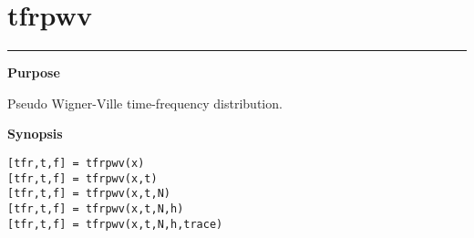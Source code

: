 

\section*{\hspace*{-1.6cm} tfrpwv}

\vspace*{-.4cm}
\hspace*{-1.6cm}\rule[0in]{16.5cm}{.02cm}
\vspace*{.2cm}

{\bf \large \sf Purpose}\\
\hspace*{1.5cm}
\begin{minipage}[t]{13.5cm}
Pseudo Wigner-Ville time-frequency distribution.
\end{minipage}
\vspace*{.5cm}

{\bf \large \sf Synopsis}\\
\hspace*{1.5cm}
\begin{minipage}[t]{13.5cm}
\begin{verbatim}
[tfr,t,f] = tfrpwv(x)
[tfr,t,f] = tfrpwv(x,t)
[tfr,t,f] = tfrpwv(x,t,N)
[tfr,t,f] = tfrpwv(x,t,N,h)
[tfr,t,f] = tfrpwv(x,t,N,h,trace)
\end{verbatim}
\end{minipage}
\vspace*{.5cm}

